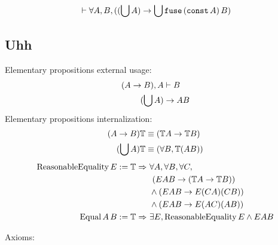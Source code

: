 \documentclass{article}
\begin{document}
  \begin{align*}
    &\vdash \forall A, B, ((\bigcup A) \to \bigcup \operatorname{\texttt{fuse}}\,(\operatorname{\texttt{const}} A)\,B)\\
  \end{align*}
  
    
  \subsection{Uhh}
  Elementary propositions external usage:
  \begin{align*}
    (A \to B), A &\vdash B\\
    (\bigcup A) &\to AB\\
  \end{align*}
  Elementary propositions internalization:
  \begin{align*}
    (A \to B)\mathbb{T} &\equiv (\mathbb{T}A \to \mathbb{T}B)\\
    (\bigcup A)\mathbb{T} &\equiv (\forall B, \mathbb{T}(AB))\\
  \end{align*}
  \begin{align*}
    \mathrm{ReasonableEquality}\,E := \nameabst{\mathbb{T}}\ &\forall A, \forall B, \forall C,\\
      &\ (EAB \to (\mathbb{T}A \to \mathbb{T}B))\\
      &\wedge (EAB \to E(CA)(CB))\\
      &\wedge (EAB \to E(AC)(AB))\\
    \mathrm{Equal}\,A\,B := \nameabst{\mathbb{T}}\ &\exists E, \mathrm{ReasonableEquality}\,E \wedge EAB
  \end{align*}
  
  Axioms:
  
\end{document}
